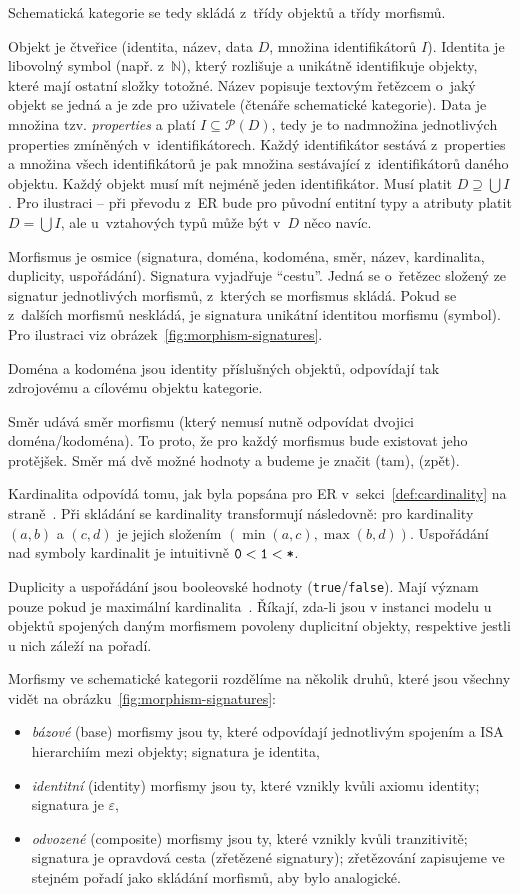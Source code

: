 Schematická kategorie se tedy skládá z~třídy objektů a třídy morfismů.

Objekt je čtveřice (identita, název, data $D$, množina identifikátorů $I$).
Identita je libovolný symbol (např. z~$\mathbb N$), který rozlišuje a unikátně identifikuje objekty, které mají ostatní složky totožné.
Název popisuje textovým řetězcem o~jaký objekt se jedná a je zde pro uživatele (čtenáře schematické kategorie).
Data je množina tzv. \emph{properties} a platí $I\subseteq \mathcal P(D)$, tedy je to nadmnožina jednotlivých properties zmíněných v~identifikátorech.
Každý identifikátor sestává z~properties a množina všech identifikátorů je pak množina sestávající z~identifikátorů daného objektu.
Každý objekt musí mít nejméně jeden identifikátor.
Musí platit $D\supseteq \bigcup I$.
Pro ilustraci -- při převodu z~ER bude pro původní entitní typy a atributy platit $D = \bigcup I$, ale u~vztahových typů může být v~$D$ něco navíc.

Morfismus je osmice (signatura, doména, kodoména, směr, název, kardinalita, duplicity, uspořádání).
Signatura vyjadřuje \enquote{cestu}.
Jedná se o~řetězec složený ze signatur jednotlivých morfismů, z~kterých se morfismus skládá.
Pokud se z~dalších morfismů neskládá, je signatura unikátní identitou morfismu (symbol).
Pro ilustraci viz obrázek~\ref{fig:morphism-signatures}.

Doména a kodoména jsou identity příslušných objektů, odpovídají tak zdrojovému a cílovému objektu kategorie.

Směr udává směr morfismu (který nemusí nutně odpovídat dvojici doména/kodoména).
To proto, že pro každý morfismus bude existovat jeho protějšek.
Směr má dvě možné hodnoty a budeme je značit \one{} (tam), \zero{} (zpět).

Kardinalita odpovídá tomu, jak byla popsána pro ER v~sekci~\ref{def:cardinality} na straně~\pageref{def:cardinality}.
Při skládání se kardinality transformují následovně: pro kardinality $(a, b)$ a $(c, d)$ je jejich složením $(\min(a, c), \max(b, d))$.
Uspořádání nad symboly kardinalit je intuitivně $\texttt{0} < \texttt{1} < \texttt{*}$.

Duplicity a uspořádání jsou booleovské hodnoty (\texttt{true}/\texttt{false}).
Mají význam pouze pokud je maximální kardinalita~\many.
Říkají, zda-li jsou v instanci modelu u objektů spojených daným morfismem povoleny duplicitní objekty, respektive jestli u nich záleží na pořadí.

Morfismy ve schematické kategorii rozdělíme na několik druhů, které jsou všechny vidět na obrázku~\ref{fig:morphism-signatures}:
\begin{itemize}
  \item \emph{bázové} (base) morfismy jsou ty, které odpovídají jednotlivým spojením a ISA hierarchiím mezi objekty; signatura je identita,
  \item \emph{identitní} (identity) morfismy jsou ty, které vznikly kvůli axiomu identity; signatura je $\varepsilon$,
  \item \emph{odvozené} (composite) morfismy jsou ty, které vznikly kvůli tranzitivitě; signatura je opravdová cesta (zřetězené signatury); zřetězování zapisujeme ve stejném pořadí jako skládání morfismů, aby bylo analogické.
\end{itemize}


